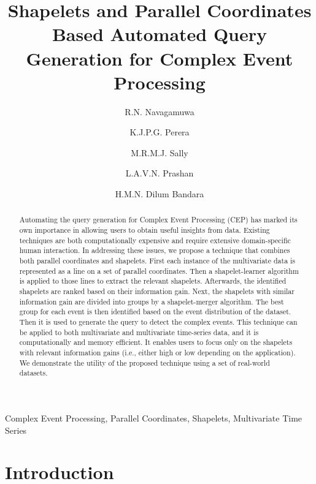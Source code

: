 \documentclass[conference]{IEEEtran}  %
\title{\LARGE \bf
Shapelets and Parallel Coordinates Based Automated Query Generation for Complex Event Processing
}
\author{R.N. Navagamuwa}
\author{K.J.P.G. Perera}
\author{M.R.M.J. Sally}
\author{L.A.V.N. Prashan}
\author{H.M.N. Dilum Bandara}
\affil[]{Department of Computer Science and Engineering\protect\\ University Of Moratuwa\protect\\ Katubedda, Sri Lanka \authorcr Email: {\tt (randika.12, pravinda.12, jaward.12, prashan.12, dilumb)@cse.mrt.ac.lk} \vspace{-2ex}}
\begin{document}
\graphicspath{ {images/} }


\maketitle
\thispagestyle{empty}
\pagestyle{empty}


\begin{abstract}

Automating the query generation for Complex Event Processing (CEP) has marked its own importance in allowing users to obtain useful insights from data. Existing techniques are both computationally expensive and require extensive domain-specific human interaction. In addressing these issues, we propose a technique that combines both parallel coordinates and shapelets. First each instance of the multivariate data is represented as a line on a set of parallel coordinates. Then a shapelet-learner algorithm is applied to those lines to extract the relevant shapelets. Afterwards, the identified shapelets are ranked based on their information gain. Next, the shapelets with similar information gain are divided into groups by a shapelet-merger algorithm. The best group for each event is then identified based on the event distribution of the dataset. Then it is used to generate the query to detect the complex events. This technique can be applied to both multivariate and multivariate time-series data, and it is computationally and memory efficient. It enables users to focus only on the shapelets with relevant information gains (i.e., either high or low depending on the application). We demonstrate the utility of the proposed technique using a set of real-world datasets.  

\end{abstract}

\begin{IEEEkeywords} 
Complex Event Processing, Parallel Coordinates, Shapelets, Multivariate Time Series
\end{IEEEkeywords}

\section{Introduction}
\end{document}
